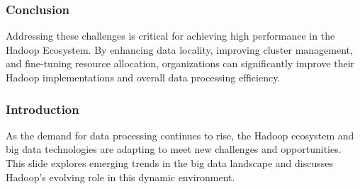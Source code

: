 \documentclass[aspectratio=169]{beamer}
\begin{document}
\begin{frame}[fragile]
    \frametitle{Conclusion}
    Addressing these challenges is critical for achieving high performance in the Hadoop Ecosystem. By enhancing data locality, improving cluster management, and fine-tuning resource allocation, organizations can significantly improve their Hadoop implementations and overall data processing efficiency.
\end{frame}

\begin{frame}
    \titlepage
\end{frame}

\begin{frame}[fragile]
    \frametitle{Introduction}
    As the demand for data processing continues to rise, the Hadoop ecosystem and big data technologies are adapting to meet new challenges and opportunities. 
    This slide explores emerging trends in the big data landscape and discusses Hadoop's evolving role in this dynamic environment.
\end{frame}
\end{document}
